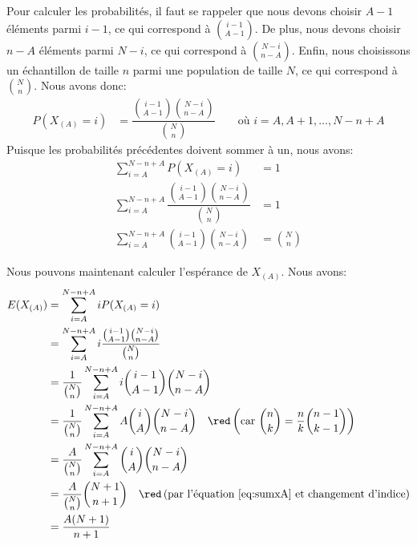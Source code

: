 \documentclass[10pt]{article}
\begin{document}
Pour calculer les probabilités, il faut se rappeler que nous devons
choisir \(A-1\) éléments parmi \(i-1\), ce qui correspond à
\(\binom{i-1}{A-1}\). De plus, nous devons choisir \(n-A\) éléments
parmi \(N-i\), ce qui correspond à \(\binom{N-i}{n-A}\). Enfin, nous
choisissons un échantillon de taille \(n\) parmi une population de
taille \(N\), ce qui correspond à \(\binom{N}{n}\). Nous avons donc:
\begin{align*}
P(X_{(A)}=i) &= \dfrac{\binom{i-1}{A-1}\binom{N-i}{n-A}}{\binom{N}{n}} \qquad \text{où } i=A,A+1,\ldots,N-n+A
\end{align*} Puisque les probabilités précédentes doivent sommer à un,
nous avons: \begin{align}
\sum_{i=A}^{N-n+A} P(X_{(A)}=i) &= 1 \nonumber\\
\sum_{i=A}^{N-n+A} \dfrac{\binom{i-1}{A-1}\binom{N-i}{n-A}}{\binom{N}{n}} &= 1 \nonumber\\
\sum_{i=A}^{N-n+A} \binom{i-1}{A-1}\binom{N-i}{n-A} &= \binom{N}{n} \label{eq:sumxA}
\end{align}

Nous pouvons maintenant calculer l'espérance de \(X_{(A)}\). Nous avons:
\begin{align}
E(X_{(A)}) &= \sum_{i=A}^{N-n+A} iP(X_{(A)}=i) \nonumber\\
&= \sum_{i=A}^{N-n+A} i\dfrac{\binom{i-1}{A-1}\binom{N-i}{n-A}}{\binom{N}{n}} \nonumber\\
&= \dfrac{1}{\binom{N}{n}}\sum_{i=A}^{N-n+A} i\binom{i-1}{A-1}\binom{N-i}{n-A} \nonumber\\
&= \dfrac{1}{\binom{N}{n}}\sum_{i=A}^{N-n+A} A\binom{i}{A}\binom{N-i}{n-A} 
\comeq{car $\binom{n}{k}=\dfrac{n}{k}\binom{n-1}{k-1}$} \nonumber\\
&= \dfrac{A}{\binom{N}{n}}\sum_{i=A}^{N-n+A} \binom{i}{A}\binom{N-i}{n-A} \nonumber\\
&= \dfrac{A}{\binom{N}{n}}\binom{N+1}{n+1} \comeq{par l'équation \ref{eq:sumxA} et changement d'indice} \nonumber\\
&= \dfrac{A(N+1)}{n+1} \label{eq:esperancexA}
\end{align}


\end{document}
